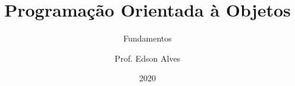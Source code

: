 \title{Programação Orientada à Objetos}
\subtitle{Fundamentos}
\date{2020}
\author{Prof. Edson Alves}
